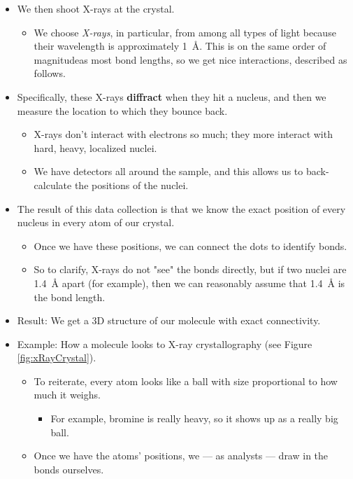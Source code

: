 \documentclass[../notes.tex]{subfiles}
\begin{document}
\begin{itemize}
\begin{itemize}
        \item We then shoot X-rays at the crystal.
        \begin{itemize}
            \item We choose \emph{X-rays}, in particular, from among all types of light because their wavelength is approximately \SI{1}{\angstrom}. This is on the same order  of magnitudeas most bond lengths, so we get nice interactions, described as follows.
        \end{itemize}
        \item Specifically, these X-rays \textbf{diffract} when they hit a nucleus, and then we measure the location to which they bounce back.
        \begin{itemize}
            \item X-rays don't interact with electrons so much; they more interact with hard, heavy, localized nuclei.
            \item We have detectors all around the sample, and this allows us to back-calculate the positions of the nuclei.
        \end{itemize}
        \item The result of this data collection is that we know the exact position of every nucleus in every atom of our crystal.
        \begin{itemize}
            \item Once we have these positions, we can connect the dots to identify bonds.
            \item So to clarify, X-rays do not "see" the bonds directly, but if two nuclei are \SI{1.4}{\angstrom} apart (for example), then we can reasonably assume that \SI{1.4}{\angstrom} is the bond length.
        \end{itemize}
        \item Result: We get a 3D structure of our molecule with exact connectivity.
        \item Example: How a molecule looks to X-ray crystallography (see Figure \ref{fig:xRayCrystal}).
        \begin{itemize}
            \item To reiterate, every atom looks like a ball with size proportional to how much it weighs.
            \begin{itemize}
                \item For example, bromine is really heavy, so it shows up as a really big ball.
            \end{itemize}
            \item Once we have the atoms' positions, we --- as analysts --- draw in the bonds ourselves.

\end{itemize}
\end{itemize}
\end{itemize}
\end{document}
